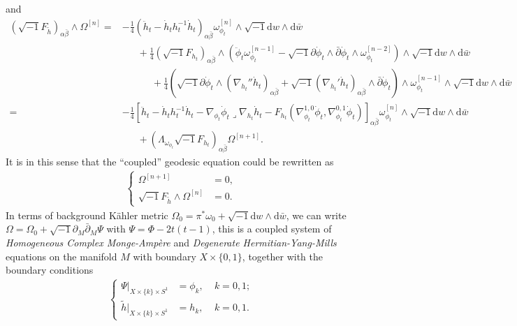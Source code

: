 \documentclass[10pt, letterpaper]{amsart}
\theoremstyle{plain}
\theoremstyle{definition}
\numberwithin{equation}{section}
\begin{document}
and 
\begin{align}
    \left(\sqrt{-1}F_{\widetilde h}\right)_{\alpha\bar\beta}\wedge\Omega^{[n]}
     = 
     &- \frac{1}{4}\left(\ddot h_t - \dot h_t h_t^{-1}\dot h_t\right)_{\alpha\bar\beta}\omega_{\phi_t}^{[n]}\wedge\sqrt{-1}\mathrm{d}w\wedge\mathrm{d}\bar w \nonumber\\
     & \quad\;\; + 
    \frac{1}{4}\left(\sqrt{-1}F_{h_t}\right)_{\alpha\bar\beta}\wedge \left(\ddot\phi_t \omega_{\phi_t}^{[n-1]}- \sqrt{-1}\partial\dot\phi_t\wedge \bar\partial \dot\phi_t\wedge\omega_{\phi_t}^{[n-2]}\right)\wedge \sqrt{-1}\mathrm{d}w\wedge \mathrm{d}\bar w \nonumber\\
     &\quad\qquad +
    \frac{1}{4}\left( 
    \sqrt{-1}\partial\dot\phi_t \wedge \left(\nabla_{h_t}''\dot h_t\right)_{\alpha\bar\beta}
    + 
    \sqrt{-1}\left(\nabla_{h_t}'\dot h_t\right)_{\alpha\bar\beta}\wedge \bar\partial \dot\phi_t\right)\wedge \omega_{\phi_t}^{[n-1]}\wedge \sqrt{-1}\mathrm{d}w\wedge\mathrm{d}\bar w \nonumber\\
     = 
     &-
     \frac{1}{4}\left[  
    \ddot h_t -\dot h_th_t^{-1}\dot h_t
    - 
    \nabla_{\phi_t} \dot\phi_t\lrcorner \nabla_{h_t}\dot h_t
    - 
    F_{h_t}\left(\nabla^{1,0}_{\phi_t}\dot\phi_t, \nabla^{0,1}_{\phi_t}\dot\phi_t\right)
    \right]_{\alpha\bar\beta}\omega_{\phi_t}^{[n]}\wedge \sqrt{-1}\mathrm{d}w\wedge \mathrm{d}\bar w\nonumber\\
    &\quad\;\; +  \left(\Lambda_{\omega_{\phi_t}}\sqrt{-1}F_{h_t}\right)_{\alpha\bar\beta}\Omega^{[n+1]}.
\end{align}
It is in this sense that the ``coupled'' geodesic equation could be rewritten as 
\begin{align}
\left\{
\begin{array}{rl}
\Omega^{[n+1]}
& = 0, \\
\sqrt{-1}F_{\widetilde h}\wedge \Omega^{[n]}
& =0.
\end{array}
\right.
\end{align}
In terms of background K\"ahler metric $\Omega_0=\pi^*\omega_0 + \sqrt{-1}\mathrm{d}w\wedge\mathrm{d}\bar w$, we can write $\Omega=\Omega_0+\sqrt{-1}\partial_M\bar\partial_M \Psi$ with $\Psi=\Phi- 2t\left(t-1\right)$, this is a coupled system of \emph{Homogeneous Complex Monge-Amp\`ere} and \emph{Degenerate Hermitian-Yang-Mills} equations on the manifold $M$ with boundary $X\times\{0,1\}$, together with the boundary conditions
\begin{align*}
\left\{
\begin{array}{lll}
\Psi|_{X\times \{k\}\times S^1}
& = \phi_k, \; &k=0,1;\\
\widetilde h|_{X\times \{k\}\times S^1}
& = h_k, \; &k=0,1.
\end{array}
\right.
\end{align*}
\end{document}
